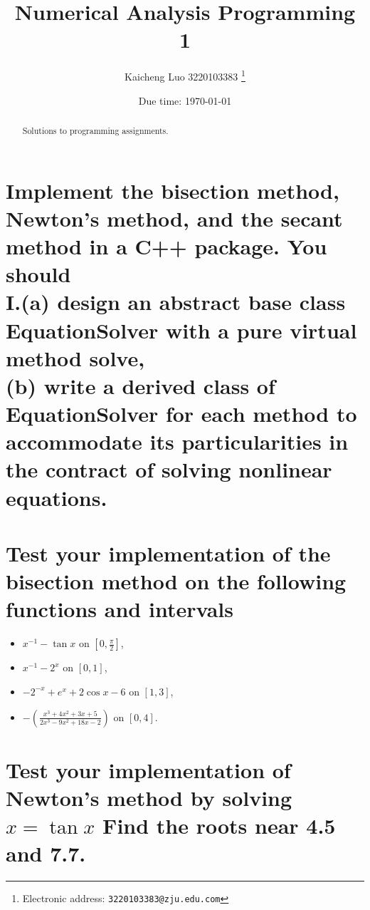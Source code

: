 \documentclass[a4paper]{article}
\begin{document}
\title{Numerical Analysis Programming 1}

\author{Kaicheng Luo 3220103383
  \thanks{Electronic address: \texttt{3220103383@zju.edu.com}}}

\date{Due time: \today}

\maketitle

\begin{abstract}
    Solutions to programming assignments.
\end{abstract}

\section*{ Implement the bisection method, Newton’s method, and the secant method in a C++ package. You should\\ 
  I.(a) design an abstract base class EquationSolver with
a pure virtual method solve,\\
(b) write a derived class of EquationSolver for each method to accommodate its particularities in the contract of solving nonlinear equations.\\}

\section*{ Test your implementation of the bisection method on the
following functions and intervals}

\begin{itemize}
  \item $x^{-1} - \tan x$ on $\left[0, \frac{\pi}{2}\right]$,
  \item $x^{-1} - 2^x$ on $[0,1]$,
  \item $-2^{-x} + e^x + 2\cos x - 6$ on $[1,3]$,
  \item $-\left(\frac{x^{3} + 4 x^{2} + 3 x + 5}{2 x^{3} - 9 x^{2} + 18 x - 2}\right)$ on $[0,4]$.
\end{itemize}



\section*{Test your implementation of Newton's method by solving $x = \tan x$ Find the roots near 4.5 and 7.7.}

\end{document}
